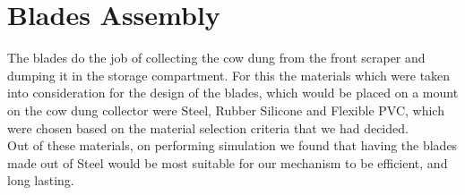\section{Blades Assembly} \label{Blades and Mount Assembly}
The blades do the job of collecting the cow dung from the front scraper and dumping it in the storage compartment. For this the materials which were taken into consideration for the design of the blades, which would be placed on a mount on the cow dung collector were Steel, Rubber Silicone and Flexible PVC, which were chosen based on the material selection criteria that we had decided. \\

Out of these materials, on performing simulation we found that having the blades made out of Steel would be most suitable for our mechanism to be efficient, and long lasting. \\

\begin{table}[!ht]
\caption{Stress and Displacement Analysis of Blades Assembly}
\end{table}


